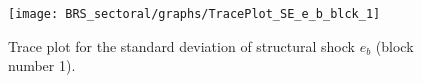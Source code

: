 \begin{figure}[H]
\centering
  \texttt{[image: BRS\_sectoral/graphs/TracePlot\_SE\_e\_b\_blck\_1]}\\
    \caption{Trace plot for the standard deviation of structural shock ${e_b}$ (block number 1).}
\end{figure}
